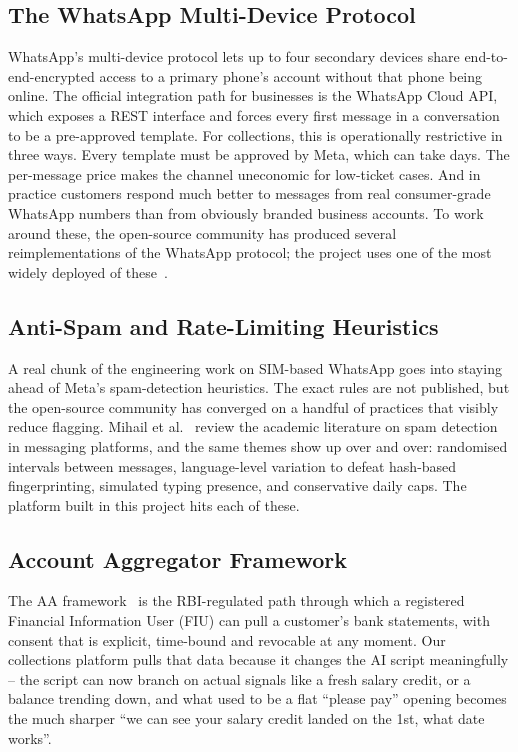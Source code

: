 \subsection{The WhatsApp Multi-Device Protocol}
WhatsApp's multi-device protocol lets up to four secondary devices share end-to-end-encrypted access to a primary phone's account without that phone being online. The official integration path for businesses is the WhatsApp Cloud API, which exposes a REST interface and forces every first message in a conversation to be a pre-approved template. For collections, this is operationally restrictive in three ways. Every template must be approved by Meta, which can take days. The per-message price makes the channel uneconomic for low-ticket cases. And in practice customers respond much better to messages from real consumer-grade WhatsApp numbers than from obviously branded business accounts. To work around these, the open-source community has produced several reimplementations of the WhatsApp protocol; the project uses one of the most widely deployed of these~\cite{baileys}.

\subsection{Anti-Spam and Rate-Limiting Heuristics}
A real chunk of the engineering work on SIM-based WhatsApp goes into staying ahead of Meta's spam-detection heuristics. The exact rules are not published, but the open-source community has converged on a handful of practices that visibly reduce flagging. Mihail et al.~\cite{antispam} review the academic literature on spam detection in messaging platforms, and the same themes show up over and over: randomised intervals between messages, language-level variation to defeat hash-based fingerprinting, simulated typing presence, and conservative daily caps. The platform built in this project hits each of these.

\subsection{Account Aggregator Framework}
The AA framework~\cite{aarbi} is the RBI-regulated path through which a registered Financial Information User (FIU) can pull a customer's bank statements, with consent that is explicit, time-bound and revocable at any moment. Our collections platform pulls that data because it changes the AI script meaningfully -- the script can now branch on actual signals like a fresh salary credit, or a balance trending down, and what used to be a flat ``please pay'' opening becomes the much sharper ``we can see your salary credit landed on the 1st, what date works''.

